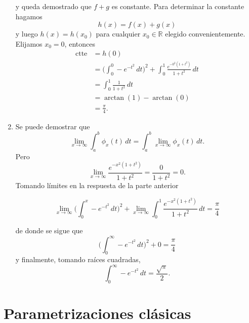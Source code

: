 \documentclass[mid,fleqn,draft,twoside]{notasdeclase}
\newcommand{\inte}[4]{\int_{#1}^{#2} #3\, d#4}
\newcommand{\R}{\mathbb{R}}
\begin{document}
\begin{ejem}
\begin{enumerate}
		 y queda demostrado que $f+g$ es constante. Para determinar la constante hagamos 
		\[ h(x)  = f(x)+g(x) \]
		y luego $h(x)=h(x_0)$ para cualquier $x_0\in\R$ elegido convenientemente. Elijamos $x_0=0$, entonces
		\begin{align*}
			\mathrm{ctte} &= h(0)\\
						  &= \bigg(\inte{0}{0}{-e^{-t^2}}{t}\bigg)^2 + \inte{0}{1}{\frac{e^{-0^2(1+t^2)}}{1+t^2}}{t} \\
						  &= \inte{0}{1}{\frac{1}{1+t^2}}{t} \\
						  &= \arctan(1)-\arctan(0) \\
						  &=\frac \pi 4.
		\end{align*}
		\item Se puede demostrar que 
		\[ \lim\limits_{x\to\infty}\inte{a}{b}{\phi_x(t)}{t} =\inte{a}{b}{ \lim\limits_{x\to\infty}\phi_x(t)}{t}. \]
		Pero
		\[ \lim\limits_{x\to\infty}\frac{e^{-x^2(1+t^2)}}{1+t^2} = \frac{0}{1+t^2} = 0. \]
		Tomando límites en la respuesta de la parte anterior
		
		\[ \lim\limits_{x\to\infty}\bigg(\inte{0}{x}{-e^{-t^2}}{t}\bigg)^2 + \lim\limits_{x\to\infty}\inte{0}{1}{\frac{e^{-x^2(1+t^2)}}{1+t^2}}{t} = \frac{\pi}{4} \]
		
		de donde se sigue que
		\[ \bigg(\inte{0}{\infty}{-e^{-t^2}}{t}\bigg)^2 + 0 = \frac{\pi}{4} \]
		y finalmente, tomando raíces cuadradas,
		\[ \inte{0}{\infty}{-e^{-t^2}}{t} = \frac{\sqrt{\pi}}{2}. \]
	\end{enumerate}
\end{ejem}

\section{Parametrizaciones clásicas}
\end{document}
